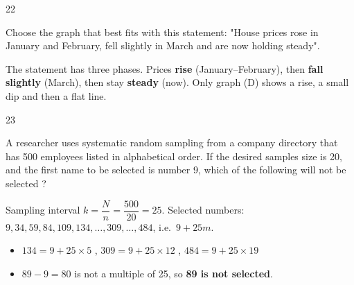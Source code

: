 \begin{question}{22}
{Choose the graph that best fits with this statement: "House prices rose in January and February, fell slightly in March and are now holding steady".\par}
\begin{explain}
The statement has three phases. Prices \textbf{rise} (January--February), then \textbf{fall slightly} (March), then stay \textbf{steady} (now). Only graph (D) shows a rise, a small dip and then a flat line.
\end{explain}
\end{question}

\begin{question}{23}
{A researcher uses systematic random sampling from a company directory that has 500 employees listed in alphabetical order. If the desired samples size is 20, and the first name to be selected is number 9, which of the following will not be selected ?\par}
\begin{explain}
Sampling interval $k=\dfrac{N}{n}=\dfrac{500}{20}=25$. Selected numbers: $9, 34, 59, 84, 109, 134, \ldots, 309, \ldots, 484$, i.e.\ $9+25m$.
\begin{itemize}
\item $134=9+25\times5$ \checkmark, $309=9+25\times12$ \checkmark, $484=9+25\times19$ \checkmark
\item $89-9=80$ is not a multiple of 25, so \textbf{89 is not selected}.
\end{itemize}
\end{explain}
\end{question}

